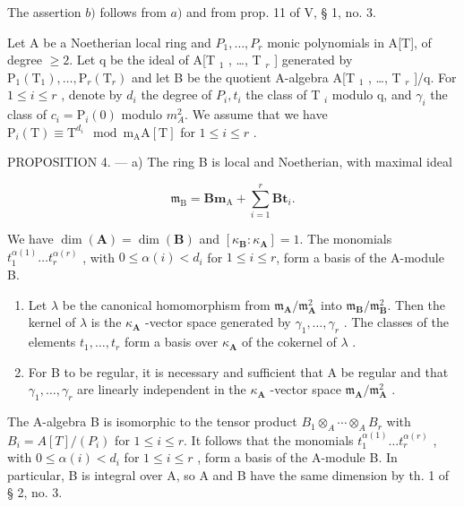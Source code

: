 The assertion \(b)\) follows from \(a)\) and from prop. 11 of V, § 1, no. 3.

Let A be a Noetherian local ring and \(P_{1}, \ldots, P_{r}\) monic polynomials in A{[}T{]}, of degree \(\geqslant 2\). Let q be the ideal of A{[}T \(_{1}\) , \ldots, T \(_{r}\) {]} generated by \(\mathrm{P}_{1}(\mathrm{T}_{1}), \ldots, \mathrm{P}_{r}(\mathrm{T}_{r})\) and let B be the quotient A-algebra A{[}T \(_{1}\) , \ldots, T \(_{r}\) {]}/q. For \(1 \leqslant i \leqslant r\) , denote by \(d_{i}\) the degree of \(P_{i}, t_{i}\) the class of T \(_{i}\) modulo q, and \(\gamma_{i}\) the class of \(c_{i} = \mathrm{P}_{i}(0)\) modulo \(m_{A}^{2}\). We assume that we have \(\mathrm{P}_{i}(\mathrm{T}) \equiv \mathrm{T}^{d_{i}} \mod \mathrm{m}_{\mathrm{A}}\mathrm{A}[\mathrm{T}]\) for \(1 \leqslant i \leqslant r\) .

PROPOSITION 4. --- a) The ring B is local and Noetherian, with maximal ideal

\[
\mathfrak {m} _ {\mathrm{B}} = \mathbf {B m} _ {\mathrm{A}} + \sum_ {i = 1} ^ {r} \mathbf {B t} _ {i}.
\]

We have \(\dim(\mathbf{A}) = \dim(\mathbf{B})\) and \([\kappa_{\mathbf{B}}: \kappa_{\mathbf{A}}] = 1\). The monomials \(t_1^{\alpha(1)} \ldots t_r^{\alpha(r)}\) , with \(0 \leqslant \alpha(i) < d_i\) for \(1 \leqslant i \leqslant r\), form a basis of the A-module B.

\begin{enumerate}
\def\labelenumi{\alph{enumi})}
\setcounter{enumi}{1}
\item
  Let \(\lambda\) be the canonical homomorphism from \(\mathfrak{m}_{\mathbf{A}} / \mathfrak{m}_{\mathbf{A}}^{2}\) into \(\mathfrak{m}_{\mathbf{B}} / \mathfrak{m}_{\mathbf{B}}^{2}\). Then the kernel of \(\lambda\) is the \(\kappa_{\mathbf{A}}\) -vector space generated by \(\gamma_{1}, \ldots, \gamma_{r}\) . The classes of the elements \(t_{1}, \ldots, t_{r}\) form a basis over \(\kappa_{\mathbf{A}}\) of the cokernel of \(\lambda\) .
\item
  For B to be regular, it is necessary and sufficient that A be regular and that \(\gamma_{1},\ldots,\gamma_{r}\) are linearly independent in the \(\kappa_{\mathbf{A}}\) -vector space \(\mathfrak{m}_{\mathbf{A}}/\mathfrak{m}_{\mathbf{A}}^{2}\) .
\end{enumerate}

The A-algebra B is isomorphic to the tensor product \(B_{1} \otimes_{A} \cdots \otimes_{A} B_{r}\) with \(B_{i} = A[T]/(P_{i})\) for \(1 \leqslant i \leqslant r\). It follows that the monomials \(t_{1}^{\alpha(1)} \ldots t_{r}^{\alpha(r)}\) , with \(0 \leqslant \alpha(i) < d_{i}\) for \(1 \leqslant i \leqslant r\) , form a basis of the A-module B. In particular, B is integral over A, so A and B have the same dimension by th. 1 of § 2, no. 3.


